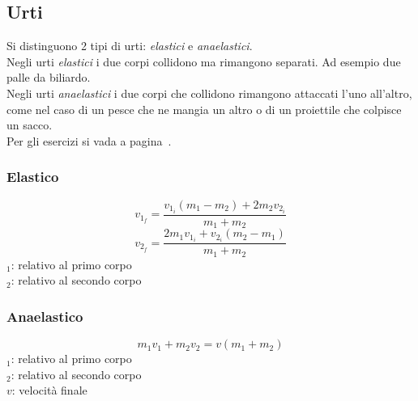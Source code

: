 \subsection{Urti}\label{subsec:dinamica:urti}
Si distinguono 2 tipi di urti: \emph{elastici} e \emph{anaelastici}.\\[\baselineskip]
Negli urti \emph{elastici} i due corpi collidono ma rimangono separati. Ad esempio due palle
da biliardo.\\
Negli urti \emph{anaelastici} i due corpi che collidono rimangono attaccati l'uno all'altro,
come nel caso di un pesce che ne mangia un altro o di un proiettile che colpisce un sacco.\\

Per gli esercizi si vada a pagina~\pageref{ex:urti}.

\subsubsection{Elastico}
\begin{equation*}
v_{1_f} = \frac{v_{1_i}\left(m_1-m_2\right) + 2m_2v_{2_i}}{m_1+m_2}
\end{equation*}
\begin{equation*}
v_{2_f} = \frac{2m_1v_{1_i} + v_{2_i}\left(m_2-m_1\right)}{m_1+m_2}
\end{equation*}
$_1$: relativo al primo corpo\\
$_2$: relativo al secondo corpo

\subsubsection{Anaelastico}
\begin{equation*}
m_1v_1 + m_2v_2 = v(m_1+m_2)
\end{equation*}
$_1$: relativo al primo corpo\\
$_2$: relativo al secondo corpo\\
$v$: velocità finale

